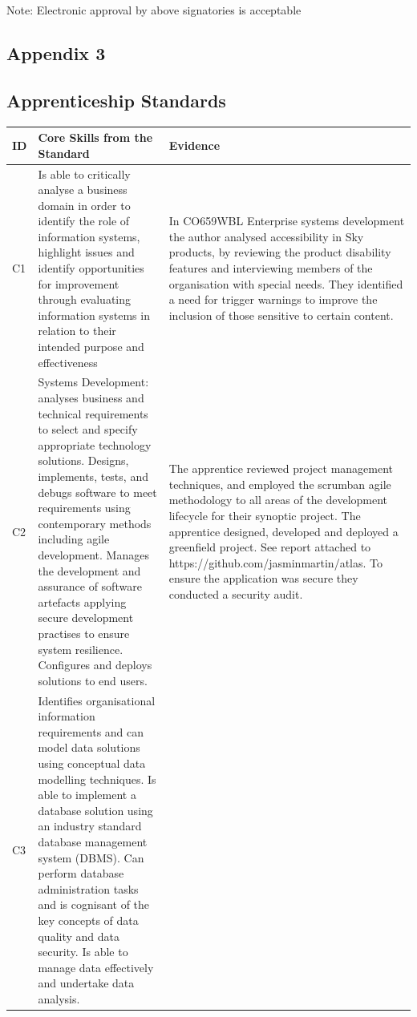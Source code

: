\documentclass{article}
\begin{document}
Note: Electronic approval by above signatories is acceptable

\newpage

\begin{landscape}
\section{Appendix 3}
\subsection{Apprenticeship Standards}
\label{sec:appendix-3}
\singlespacing

\begin{longtable}{|l|p{10cm}|p{10cm}|}
\hline
\textbf{ID} &
  \textbf{Core Skills from the Standard} &
  \textbf{Evidence} \\ \hline
\endhead
%
C1 &
  Is able to critically analyse   a business domain in order to identify the role of information systems,   highlight issues and identify opportunities for improvement through   evaluating information systems in relation to their intended purpose and   effectiveness &
  In CO659WBL Enterprise systems   development the  author analysed   accessibility in Sky products, by reviewing the product disability features   and interviewing members of the organisation with special needs. They identified   a need for trigger warnings to improve the inclusion of those sensitive to   certain content. \\ \hline
C2 &
  Systems Development: analyses   business and technical requirements to select and specify appropriate   technology solutions. Designs, implements, tests, and debugs software to meet   requirements using contemporary methods including agile development. Manages   the development and assurance of software artefacts applying secure   development practises to ensure system resilience. Configures and deploys   solutions to end users. &
  The apprentice reviewed   project management techniques, and employed the scrumban agile methodology to   all areas of the development lifecycle for their synoptic project. The   apprentice designed, developed and deployed a greenfield project. See report   attached to https://github.com/jasminmartin/atlas. To ensure the application   was secure they conducted a security audit. \\ \hline
C3 &
  Identifies organisational   information requirements and can model data solutions using conceptual data   modelling techniques. Is able to implement a database solution using an   industry standard database management system (DBMS). Can perform database   administration tasks and is cognisant of the key concepts of data quality and   data security. Is able to manage data effectively and undertake data   analysis. &

\end{longtable}
\end{landscape}
\end{document}
